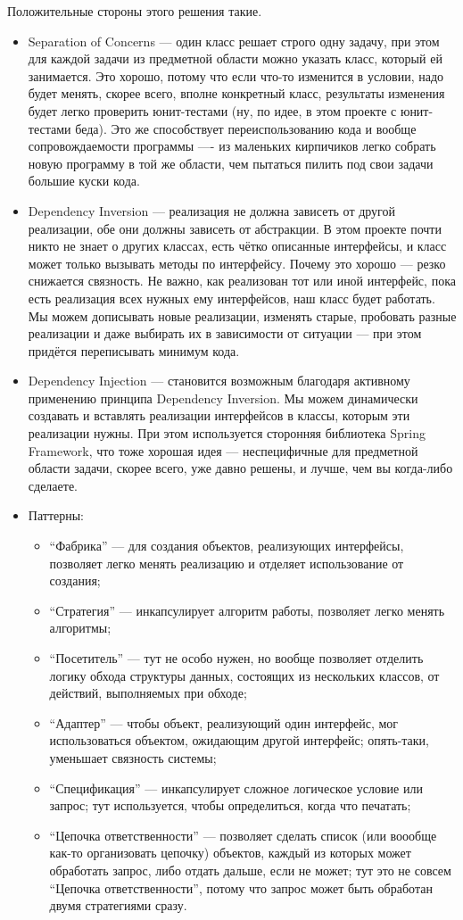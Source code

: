 \documentclass[a5paper]{article}
\begin{document}
Положительные стороны этого решения такие.
\begin{itemize}
	\item Separation of Concerns --- один класс решает строго одну задачу, при этом для каждой задачи из предметной области можно указать класс, который ей занимается. Это хорошо, потому что если что-то изменится в условии, надо будет менять, скорее всего, вполне конкретный класс, результаты изменения будет легко проверить юнит-тестами (ну, по идее, в этом проекте с юнит-тестами беда). Это же способствует переиспользованию кода и вообще сопровождаемости программы ---- из маленьких кирпичиков легко собрать новую программу в той же области, чем пытаться пилить под свои задачи большие куски кода.
	\item Dependency Inversion --- реализация не должна зависеть от другой реализации, обе они должны зависеть от абстракции. В этом проекте почти никто не знает о других классах, есть чётко описанные интерфейсы, и класс может только вызывать методы по интерфейсу. Почему это хорошо --- резко снижается связность. Не важно, как реализован тот или иной интерфейс, пока есть реализация всех нужных ему интерфейсов, наш класс будет работать. Мы можем дописывать новые реализации, изменять старые, пробовать разные реализации и даже выбирать их в зависимости от ситуации --- при этом придётся переписывать минимум кода.
	\item Dependency Injection --- становится возможным благодаря активному применению принципа Dependency Inversion. Мы можем динамически создавать и вставлять реализации интерфейсов в классы, которым эти реализации нужны. При этом используется сторонняя библиотека Spring Framework, что тоже хорошая идея --- неспецифичные для предметной области задачи, скорее всего, уже давно решены, и лучше, чем вы когда-либо сделаете.
	\item Паттерны:
	\begin{itemize}
		\item ``Фабрика'' --- для создания объектов, реализующих интерфейсы, позволяет легко менять реализацию и отделяет использование от создания;
		\item ``Стратегия'' --- инкапсулирует алгоритм работы, позволяет легко менять алгоритмы;
		\item ``Посетитель'' --- тут не особо нужен, но вообще позволяет отделить логику обхода структуры данных, состоящих из нескольких классов, от действий, выполняемых при обходе; 
		\item ``Адаптер'' --- чтобы объект, реализующий один интерфейс, мог использоваться объектом, ожидающим другой интерфейс; опять-таки, уменьшает связность системы;
		\item ``Спецификация'' --- инкапсулирует сложное логическое условие или запрос; тут используется, чтобы определиться, когда что печатать;
		\item ``Цепочка ответственности'' --- позволяет сделать список (или воообще как-то организовать цепочку) объектов, каждый из которых может обработать запрос, либо отдать дальше, если не может; тут это не совсем ``Цепочка ответственности'', потому что запрос может быть обработан двумя стратегиями сразу.
	\end{itemize}
\end{itemize}
\end{document}
